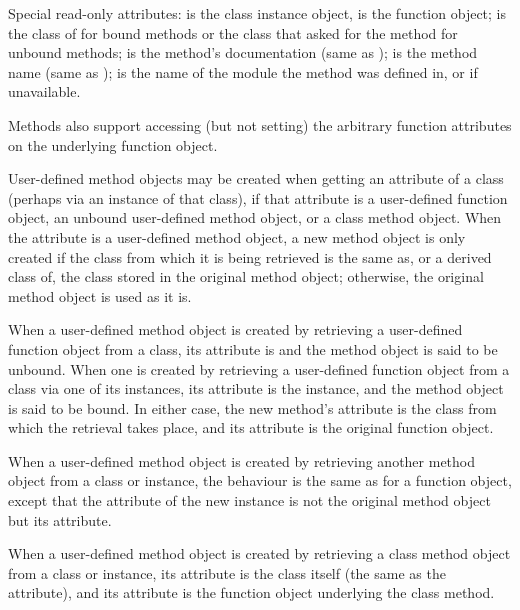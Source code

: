 \begin{description}
\begin{description}
Special read-only attributes:  is the class instance
object,  is the function object;
 is the class of  for bound methods
or the class that asked for the method for unbound methods;
 is the method's documentation (same as
);  is the method name (same as
);  is the name of the
module the method was defined in, or  if unavailable.

Methods also support accessing (but not setting) the arbitrary
function attributes on the underlying function object.

User-defined method objects may be created when getting an attribute
of a class (perhaps via an instance of that class), if that attribute
is a user-defined function object, an unbound user-defined method object,
or a class method object.
When the attribute is a user-defined method object, a new
method object is only created if the class from which it is being
retrieved is the same as, or a derived class of, the class stored
in the original method object; otherwise, the original method object
is used as it is.

When a user-defined method object is created by retrieving
a user-defined function object from a class, its 
attribute is  and the method object is said to be unbound.
When one is created by retrieving a user-defined function object
from a class via one of its instances, its  attribute
is the instance, and the method object is said to be bound.
In either case, the new method's  attribute
is the class from which the retrieval takes place, and
its  attribute is the original function object.

When a user-defined method object is created by retrieving another
method object from a class or instance, the behaviour is the same
as for a function object, except that the  attribute
of the new instance is not the original method object but its
 attribute.

When a user-defined method object is created by retrieving a
class method object from a class or instance, its 
attribute is the class itself (the same as the 
attribute), and its  attribute is the function
object underlying the class method.


\end{description}
\end{description}
